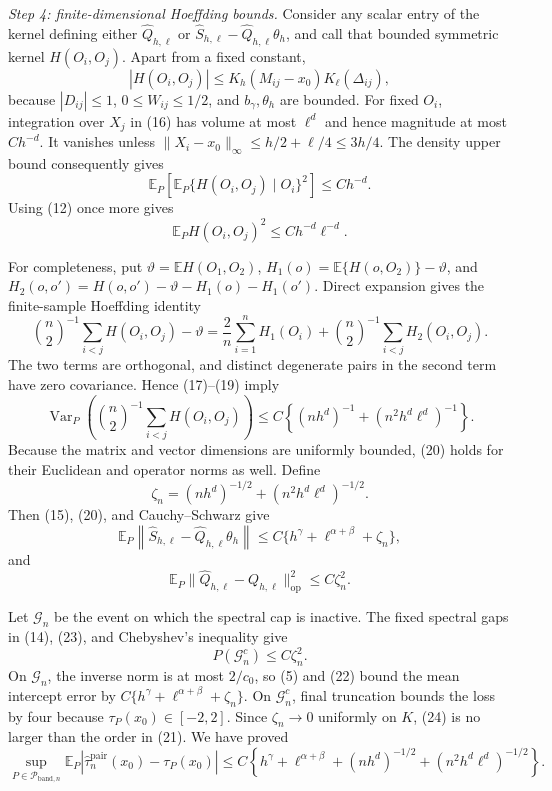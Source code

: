 \emph{Step 4: finite-dimensional Hoeffding bounds.}
Consider any scalar entry of the kernel defining either
\(\widehat Q_{h,\ell}\) or
\(\widehat S_{h,\ell}-\widehat Q_{h,\ell}\theta_h\), and call that
bounded symmetric kernel \(H(O_i,O_j)\).  Apart from a fixed constant,
\[
|H(O_i,O_j)|
\leq K_h(M_{ij}-x_0)K_\ell(\Delta_{ij}),
\tag{16}
\]
because \(|D_{ij}|\leq1\), \(0\leq W_{ij}\leq1/2\), and
\(b_\gamma,\theta_h\) are bounded.  For fixed \(O_i\), integration over
\(X_j\) in (16) has volume at most \(\ell^d\) and hence magnitude at most
\(Ch^{-d}\).  It vanishes unless
\(\lVert X_i-x_0\rVert_\infty\leq h/2+\ell/4\leq3h/4\).  The density
upper bound consequently gives
\[
\mathbb E_P\left[
\mathbb E_P\{H(O_i,O_j)\mid O_i\}^2
\right]\leq Ch^{-d}.
\tag{17}
\]
Using (12) once more gives
\[
\mathbb E_P H(O_i,O_j)^2\leq Ch^{-d}\ell^{-d}.
\tag{18}
\]

For completeness, put \(\vartheta=\mathbb EH(O_1,O_2)\),
\(H_1(o)=\mathbb E\{H(o,O_2)\}-\vartheta\), and
\(H_2(o,o')=H(o,o')-\vartheta-H_1(o)-H_1(o')\).  Direct expansion gives
the finite-sample Hoeffding identity
\[
\binom n2^{-1}\sum_{i<j}H(O_i,O_j)-\vartheta
=\frac2n\sum_{i=1}^n H_1(O_i)
+\binom n2^{-1}\sum_{i<j}H_2(O_i,O_j).
\tag{19}
\]
The two terms are orthogonal, and distinct degenerate pairs in the second term
have zero covariance.  Hence (17)--(19) imply
\[
\operatorname{Var}_P\!\left(
\binom n2^{-1}\sum_{i<j}H(O_i,O_j)
\right)
\leq C\left\{(nh^d)^{-1}+(n^2h^d\ell^d)^{-1}\right\}.
\tag{20}
\]
Because the matrix and vector dimensions are uniformly bounded, (20) holds
for their Euclidean and operator norms as well.  Define
\[
\zeta_n=(nh^d)^{-1/2}+(n^2h^d\ell^d)^{-1/2}.
\tag{21}
\]
Then (15), (20), and Cauchy--Schwarz give
\[
\mathbb E_P\left\|
\widehat S_{h,\ell}-\widehat Q_{h,\ell}\theta_h
\right\|
\leq C\{h^\gamma+\ell^{\alpha+\beta}+\zeta_n\},
\tag{22}
\]
and
\[
\mathbb E_P\lVert\widehat Q_{h,\ell}-Q_{h,\ell}\rVert_{\mathrm{op}}^2
\leq C\zeta_n^2.
\tag{23}
\]

Let \(\mathcal G_n\) be the event on which the spectral cap is inactive.
The fixed spectral gaps in (14), (23), and Chebyshev's inequality give
\[
P(\mathcal G_n^c)\leq C\zeta_n^2.
\tag{24}
\]
On \(\mathcal G_n\), the inverse norm is at most \(2/c_0\), so (5) and
(22) bound the mean intercept error by
\(C\{h^\gamma+\ell^{\alpha+\beta}+\zeta_n\}\).  On
\(\mathcal G_n^c\), final truncation bounds the loss by four because
\(\tau_P(x_0)\in[-2,2]\).  Since \(\zeta_n\to0\) uniformly on \(K\),
(24) is no larger than the order in (21).  We have proved
\[
\sup_{P\in\mathcal P_{\mathrm{band},n}}
\mathbb E_P\left|
\widehat\tau_n^{\mathrm{pair}}(x_0)-\tau_P(x_0)
\right|
\leq C\left\{
h^\gamma+\ell^{\alpha+\beta}
+(nh^d)^{-1/2}+(n^2h^d\ell^d)^{-1/2}
\right\}.
\tag{25}
\]

